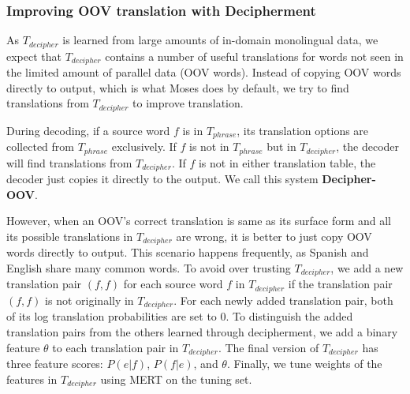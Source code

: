 \subsubsection{Improving OOV translation with Decipherment}
\label{d_oov}
As $T_{decipher}$ is learned from large amounts of in-domain monolingual data, we expect that $T_{decipher}$ contains a number of useful translations for words not seen in the limited amount of parallel data (OOV words). Instead of copying OOV words directly to output, which is what Moses does by default, we try to find translations from $T_{decipher}$ to improve translation.

During decoding, if a source word $f$ is in $T_{phrase}$, its translation options are collected from $T_{phrase}$ exclusively. If $f$ is not in $T_{phrase}$ but in $T_{decipher}$, the decoder will find translations from $T_{decipher}$. If $f$ is not in either translation table, the decoder just copies it directly to the output. We call this system \textbf{Decipher-OOV}.

However, when an OOV's correct translation is same as its surface form and all its possible translations in $T_{decipher}$ are wrong, it is better to just copy OOV words directly to output. This scenario happens frequently, as Spanish and English share many common words. To avoid over trusting $T_{decipher}$, we add a new translation pair $(f,f)$ for each source word $f$ in $T_{decipher}$ if the translation pair $(f,f)$ is not originally in $T_{decipher}$.  For each newly added translation pair, both of its log translation probabilities are set to $0$. To distinguish the added translation pairs from the others learned through decipherment, we add a binary feature $\theta$ to each translation pair in $T_{decipher}$. The final version of  $T_{decipher}$ has three feature scores: $P(e|f)$, $P(f|e)$, and $\theta$. Finally, we tune weights of the features in $T_{decipher}$ using MERT \cite{Och:2003:MER:1075096.1075117} on the tuning set.






